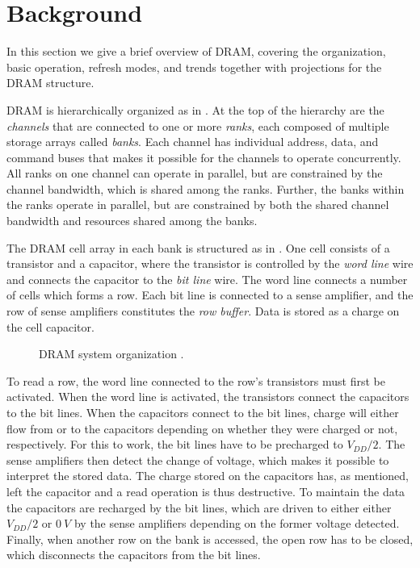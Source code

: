 \section{Background} 
\label{sec:bg}
In this section we give a brief overview of DRAM, covering the organization, basic operation, refresh modes, and trends together with projections for the DRAM structure.

DRAM is hierarchically organized as in . At the top of the hierarchy are the \textit{channels} that are connected to one or more \textit{ranks}, each composed of multiple storage arrays called \textit{banks}. Each channel has individual address, data, and command buses that makes it possible for the channels to operate concurrently. All ranks on one channel can operate in parallel, but are constrained by the channel bandwidth, which is shared among the ranks. Further, the banks within the ranks operate in parallel, but are constrained by both the shared channel bandwidth and resources shared among the banks. 

The DRAM cell array in each bank is structured as in . One cell consists of a transistor and a capacitor, where the transistor is controlled by the \textit{word line} wire and connects the capacitor to the \textit{bit line} wire. The word line connects a number of cells which forms a row. Each bit line is connected to a sense amplifier, and the row of sense amplifiers constitutes the \textit{row buffer}. Data is stored as a charge on the cell capacitor.

\begin{figure*}[t]
    \centering
	\caption{DRAM system organization \cite{raidr}.}
	\label{fig:dram_org}
\end{figure*}

To read a row, the word line connected to the row's transistors must first be activated. When the word line is activated, the transistors connect the capacitors to the bit lines. When the capacitors connect to the bit lines, charge will either flow from or to the capacitors depending on whether they were charged or not, respectively. For this to work, the bit lines have to be precharged to $V_{DD}/2$. The sense amplifiers then detect the change of voltage, which makes it possible to interpret the stored data. The charge stored on the capacitors has, as mentioned, left the capacitor and a read operation is thus destructive. To maintain the data the capacitors are recharged by the bit lines, which are driven to either either $V_{DD}/2$ or $0\:V$ by the sense amplifiers depending on the former voltage detected. Finally, when another row on the bank is accessed, the open row has to be closed, which disconnects the capacitors from the bit lines.

